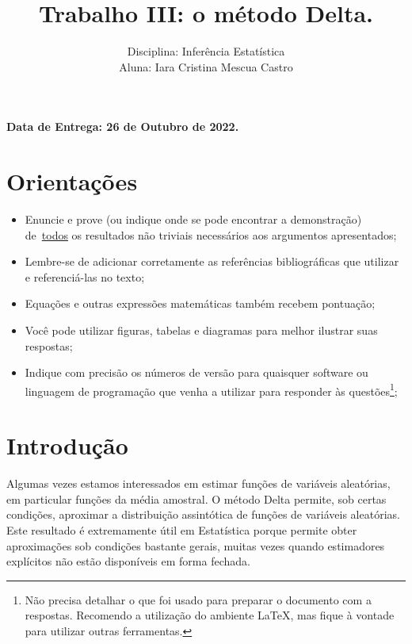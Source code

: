 \documentclass[a4paper,10pt, notitlepage]{report}
\title{Trabalho III: o método Delta.}
\author{Disciplina: Inferência Estatística \\ Aluna: Iara Cristina Mescua Castro}
\begin{document}
	\maketitle
	
	\textbf{Data de Entrega: 26 de Outubro de 2022.}
	
	\section*{Orientações}
	\begin{itemize}
		\item Enuncie e prove (ou indique onde se pode encontrar a demonstração) de~\underline{todos} os resultados não triviais necessários aos argumentos apresentados;
		\item Lembre-se de adicionar corretamente as referências bibliográficas que utilizar e referenciá-las no texto;
		\item Equações e outras expressões matemáticas também recebem pontuação;
		\item Você pode utilizar figuras, tabelas e diagramas para melhor ilustrar suas respostas;
		\item Indique com precisão os números de versão para quaisquer software ou linguagem de programação que venha a utilizar para responder às questões\footnote{Não precisa detalhar o que foi usado para preparar o documento com a respostas. Recomendo a utilização do ambiente LaTeX, mas fique à vontade para utilizar outras ferramentas.};
	\end{itemize}
	
	
	\section*{Introdução}
	
	Algumas vezes estamos interessados em estimar funções de variáveis aleatórias, em particular funções da média amostral.
	O método Delta permite, sob certas condições, aproximar a distribuição assintótica de funções de variáveis aleatórias.
	Este resultado é extremamente útil em Estatística porque permite obter aproximações sob condições bastante gerais, muitas vezes quando estimadores explícitos não estão disponíveis em forma fechada.
	
\end{document}
